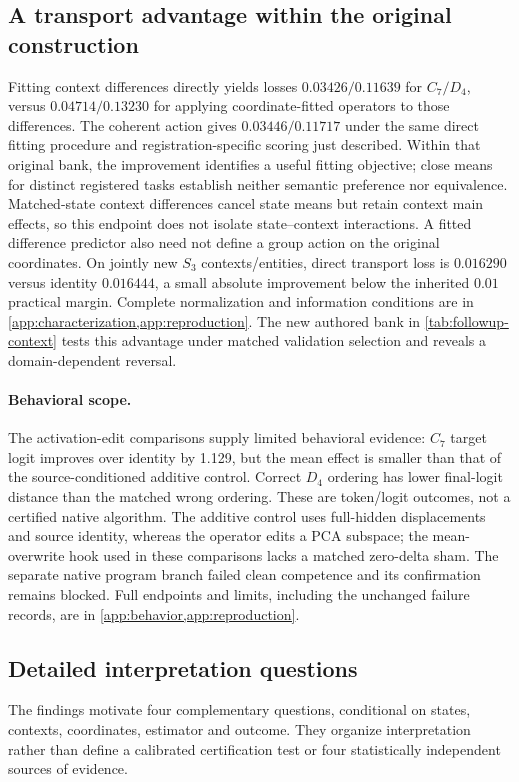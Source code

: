 \subsection{A transport advantage within the original construction}
Fitting context differences directly yields losses $0.03426/0.11639$ for $C_7/D_4$, versus $0.04714/0.13230$ for applying coordinate-fitted operators to those differences. The coherent action gives $0.03446/0.11717$ under the same direct fitting procedure and registration-specific scoring just described. Within that original bank, the improvement identifies a useful fitting objective; close means for distinct registered tasks establish neither semantic preference nor equivalence. Matched-state context differences cancel state means but retain context main effects, so this endpoint does not isolate state--context interactions. A fitted difference predictor also need not define a group action on the original coordinates. On jointly new $S_3$ contexts/entities, direct transport loss is $0.016290$ versus identity $0.016444$, a small absolute improvement below the inherited $0.01$ practical margin. Complete normalization and information conditions are in \cref{app:characterization,app:reproduction}. The new authored bank in \cref{tab:followup-context} tests this advantage under matched validation selection and reveals a domain-dependent reversal.

\paragraph{Behavioral scope.}
The activation-edit comparisons supply limited behavioral evidence: $C_7$ target logit improves over identity by 1.129, but the mean effect is smaller than that of the source-conditioned additive control. Correct $D_4$ ordering has lower final-logit distance than the matched wrong ordering. These are token/logit outcomes, not a certified native algorithm. The additive control uses full-hidden displacements and source identity, whereas the operator edits a PCA subspace; the mean-overwrite hook used in these comparisons lacks a matched zero-delta sham. The separate native program branch failed clean competence and its confirmation remains blocked. Full endpoints and limits, including the unchanged failure records, are in \cref{app:behavior,app:reproduction}.


\subsection{Detailed interpretation questions}
\label{app:detailed-reading-protocol}
The findings motivate four complementary questions, conditional on states, contexts, coordinates, estimator and outcome. They organize interpretation rather than define a calibrated certification test or four statistically independent sources of evidence.

